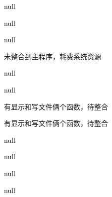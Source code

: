 \begin{DoxyRefList}
null  
\item[\label{todo__todo000003}%
\hypertarget{todo__todo000003}{}%
全局 \hyperlink{_double_link_8c_a65b4c249cc137b01fc07b9f7ffbcf46e}{Sequence\-List} (D\-L\-Node $\ast$\-List, int flag, int($\ast$\-Call\-Back\-Cmp)(const void $\ast$, const void $\ast$))]null 

null  
\item[\label{todo__todo000017}%
\hypertarget{todo__todo000017}{}%
全局 \hyperlink{_get_opt_test_8c_a30c26ca0e13ccfaaeb18bbb24eea0217}{Show\-Line} (char $\ast$filename)]未整合到主程序，耗费系统资源  
\item[\label{todo__todo000007}%
\hypertarget{todo__todo000007}{}%
全局 \hyperlink{_double_link_8c_a127d2524a910989b06852dea39a6c86f}{Show\-List} (D\-L\-Node $\ast$\-List, int flag, int judge)]null 

null  
\item[\label{todo__todo000021}%
\hypertarget{todo__todo000021}{}%
全局 \hyperlink{_get_opt_test_8c_a0dc3570bdc3b5e6b422cf4081976afff}{Statistics\-Content} (D\-L\-Node $\ast$\-List)]有显示和写文件俩个函数，待整合  
\item[\label{todo__todo000020}%
\hypertarget{todo__todo000020}{}%
全局 \hyperlink{_get_opt_test_8c_a8622568f1e4ea1d7db998a346f8e68e7}{Statistics\-Show} (D\-L\-Node $\ast$\-List)]有显示和写文件俩个函数，待整合  
\item[\label{todo__todo000005}%
\hypertarget{todo__todo000005}{}%
全局 \hyperlink{_double_link_8c_af42f761136d59421fe531e5f53db7d22}{Update\-List} (D\-L\-Node $\ast$\-List, void $\ast$data\-\_\-search, void $\ast$data\-\_\-change, int($\ast$\-Call\-Back\-Cmp)(const void $\ast$, const void $\ast$))]null 

null  
\item[\label{todo__todo000019}%
\hypertarget{todo__todo000019}{}%
全局 \hyperlink{_get_opt_test_8c_a8e8214da72e3d59826ecc3d59a7485f4}{V\-S\-\_\-\-Str\-L\-Trim} (char $\ast$p\-Str)]null  
\item[\label{todo__todo000018}%
\hypertarget{todo__todo000018}{}%
全局 \hyperlink{_get_opt_test_8c_a550c7ba0830bea9bb19ab64ee947d5e3}{V\-S\-\_\-\-Str\-R\-Trim} (char $\ast$p\-Str)]null 
\end{DoxyRefList}